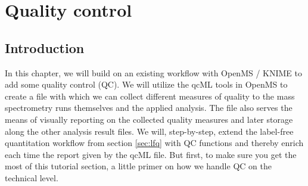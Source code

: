 
\newpage
\section{Quality control}
\label{sec:qc}

\subsection{Introduction}

In this chapter, we will build on an existing workflow with OpenMS / KNIME to add some quality control (QC). We will utilize the qcML tools in OpenMS to create a file with which we can collect different measures of quality to the mass spectrometry runs themselves and the applied analysis. The file also serves the means of visually reporting on the collected quality measures and later storage along the other analysis result files.
We will, step-by-step, extend the label-free quantitation workflow from section \ref{sec:lfq} with QC functions and thereby enrich each time the report given by the qcML file.
But first, to make sure you get the most of this tutorial section, a little primer on how we handle QC on the technical level. \\

